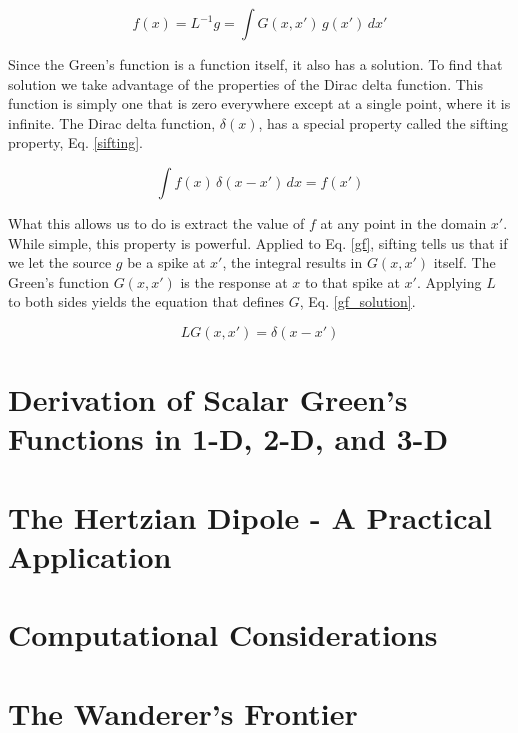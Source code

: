 \documentclass[lettersize,journal]{IEEEtran}
\begin{document}
\begin{equation}
    \label{gf}
    f(x) = L^{-1} g = \int G(x, x')\,g(x')\,dx'
\end{equation}

Since the Green's function is a function itself, it also has a solution. To find that solution we take advantage of the properties of the Dirac delta function. This function is simply one that is zero everywhere except at a single point, where it is infinite. The Dirac delta function, $\delta(x)$, has a special property called the sifting property, Eq. \eqref{sifting}.

\begin{equation}
    \label{sifting}
    \int f(x)\,\delta(x - x')\,dx = f(x')
\end{equation}

What this allows us to do is extract the value of $f$ at any point in the domain $x'$. While simple, this property is powerful. Applied to Eq. \eqref{gf}, sifting tells us that if we let the source $g$ be a spike at $x'$, the integral results in $G(x, x')$ itself. The Green's function $G(x, x')$ is the response at $x$ to that spike at $x'$. Applying $L$ to both sides yields the equation that defines $G$, Eq. \eqref{gf_solution}.

\begin{equation}
    \label{gf_solution}
    L G(x, x') = \delta(x - x')
\end{equation}


\section{Derivation of Scalar Green's Functions in 1-D, 2-D, and 3-D}


\section{The Hertzian Dipole - A Practical Application}

\section{Computational Considerations}

\section{The Wanderer's Frontier}

\nocite{*}




\newpage

\vfill
\end{document}
